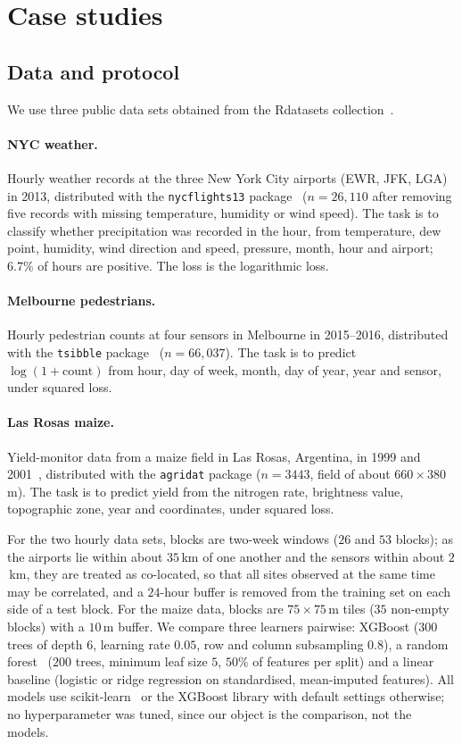 \section{Case studies}\label{sec:real}

\subsection{Data and protocol}

We use three public data sets obtained from the Rdatasets collection~\cite{rdatasets}.

\paragraph{NYC weather.} Hourly weather records at the three New York City airports (EWR, JFK, LGA) in 2013, distributed with the \texttt{nycflights13} package~\cite{nycflights13} ($n=26{,}110$ after removing five records with missing temperature, humidity or wind speed). The task is to classify whether precipitation was recorded in the hour, from temperature, dew point, humidity, wind direction and speed, pressure, month, hour and airport; $6.7\%$ of hours are positive. The loss is the logarithmic loss.

\paragraph{Melbourne pedestrians.} Hourly pedestrian counts at four sensors in Melbourne in 2015--2016, distributed with the \texttt{tsibble} package~\cite{wang2020tsibble} ($n=66{,}037$). The task is to predict $\log(1+\text{count})$ from hour, day of week, month, day of year, year and sensor, under squared loss.

\paragraph{Las Rosas maize.} Yield-monitor data from a maize field in Las Rosas, Argentina, in 1999 and 2001~\cite{anselin2004}, distributed with the \texttt{agridat} package ($n=3443$, field of about $660\times380$\,m). The task is to predict yield from the nitrogen rate, brightness value, topographic zone, year and coordinates, under squared loss.

For the two hourly data sets, blocks are two-week windows ($26$ and $53$ blocks); as the airports lie within about $35$\,km of one another and the sensors within about $2$\,km, they are treated as co-located, so that all sites observed at the same time may be correlated, and a $24$-hour buffer is removed from the training set on each side of a test block. For the maize data, blocks are $75\times75$\,m tiles ($35$ non-empty blocks) with a $10$\,m buffer. We compare three learners pairwise: XGBoost ($300$ trees of depth $6$, learning rate $0.05$, row and column subsampling $0.8$), a random forest~\cite{breiman2001} ($200$ trees, minimum leaf size $5$, $50\%$ of features per split) and a linear baseline (logistic or ridge regression on standardised, mean-imputed features). All models use scikit-learn~\cite{pedregosa2011} or the XGBoost library with default settings otherwise; no hyperparameter was tuned, since our object is the comparison, not the models.

